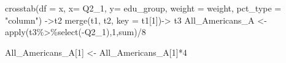 \documentclass[
]{article}
\newenvironment{Shaded}{\begin{snugshade}}{\end{snugshade}}
\newcommand{\AttributeTok}[1]{\textcolor[rgb]{0.77,0.63,0.00}{#1}}
\newcommand{\DecValTok}[1]{\textcolor[rgb]{0.00,0.00,0.81}{#1}}
\newcommand{\FunctionTok}[1]{\textcolor[rgb]{0.00,0.00,0.00}{#1}}
\newcommand{\NormalTok}[1]{#1}
\newcommand{\OtherTok}[1]{\textcolor[rgb]{0.56,0.35,0.01}{#1}}
\newcommand{\SpecialCharTok}[1]{\textcolor[rgb]{0.00,0.00,0.00}{#1}}
\newcommand{\StringTok}[1]{\textcolor[rgb]{0.31,0.60,0.02}{#1}}
\begin{document}
\begin{Shaded}
\begin{Highlighting}[]
\FunctionTok{crosstab}\NormalTok{(}\AttributeTok{df =}\NormalTok{ x, }\AttributeTok{x=}\NormalTok{ Q2\_1, }\AttributeTok{y=}\NormalTok{ edu\_group, }\AttributeTok{weight =}\NormalTok{ weight, }\AttributeTok{pct\_type =} \StringTok{"column"}\NormalTok{) }\OtherTok{{-}\textgreater{}}\NormalTok{t2}
\FunctionTok{merge}\NormalTok{(t1, t2, }\AttributeTok{key =}\NormalTok{ t1[}\DecValTok{1}\NormalTok{])}\OtherTok{{-}\textgreater{}}\NormalTok{ t3}
\NormalTok{All\_Americans\_A }\OtherTok{\textless{}{-}} \FunctionTok{apply}\NormalTok{(t3}\SpecialCharTok{\%\textgreater{}\%}\FunctionTok{select}\NormalTok{(}\SpecialCharTok{{-}}\NormalTok{Q2\_1),}\DecValTok{1}\NormalTok{,sum)}\SpecialCharTok{/}\DecValTok{8}

\NormalTok{All\_Americans\_A[}\DecValTok{1}\NormalTok{] }\OtherTok{\textless{}{-}}\NormalTok{ All\_Americans\_A[}\DecValTok{1}\NormalTok{]}\SpecialCharTok{*}\DecValTok{4}


\end{Highlighting}
\end{Shaded}
\end{document}
